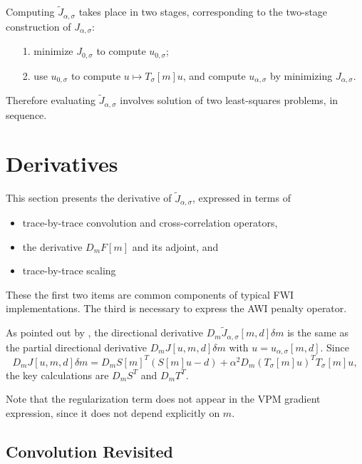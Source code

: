 Computing $\tilde{J}_{\alpha,\sigma}$ takes place in two stages, corresponding to the two-stage construction of $J_{\alpha,\sigma}$:
\begin{itemize}
\item[1. ] minimize $J_{0,\sigma}$ to compute $u_{0,\sigma}$;
\item[2. ] use $u_{0,\sigma}$ to compute $u \mapsto T_{\sigma}[m]u$, and compute $u_{\alpha,\sigma}$ by minimizing $J_{\alpha,\sigma}$.
\end{itemize}
Therefore evaluating $\tilde{J}_{\alpha,\sigma}$ involves solution of two least-squares problems, in sequence.

\section{Derivatives}
This section presents the derivative of $\tilde{J}_{\alpha,\sigma}$, expressed in terms of
\begin{itemize}
  \item trace-by-trace convolution and cross-correlation operators,
  \item the derivative $D_mF[m]$ and its adjoint, and
  \item trace-by-trace scaling
\end{itemize}
These the first two items are common components of typical FWI implementations. The
third is necessary to express the AWI penalty operator.

As pointed out by \cite{GolubPeyreyra:73}, the directional derivative $D_m\tilde{J}_{\alpha,\sigma}[m,d]\delta m$ is the same as the partial directional derivative $D_mJ[u,m,d]\delta m$ with $u = u_{\alpha,\sigma}[m,d]$. Since 
\begin{equation}
D_mJ[u,m,d]\delta m = D_mS[m]^T (S[m]u-d) + \alpha^2 D_m(T_{\sigma}[m]u)^TT_{\sigma}[m]u,
\label{eqn:basederiv}
\end{equation}
the key calculations are $D_mS^T$ and $D_m T^T$. 

Note that the regularization term does not appear in the VPM gradient expression, since it does not depend explicitly on $m$.

\subsection{Convolution Revisited}


